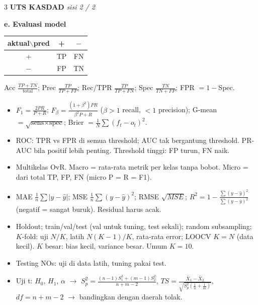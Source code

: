 \documentclass[8pt]{extarticle}
\newcommand{\sect}[1]{\par\vspace{1.5pt}\colorbox{black!12}{\parbox{\dimexpr\columnwidth-2\fboxsep}{\textbf{#1}}}\par\vspace{0.8pt}}
\begin{document}
\begin{multicols*}{3}
\textbf{UTS KASDAD} \hfill \textit{sisi 2 / 2}\par
\sect{e. Evaluasi model}
\begin{tabular}{@{}c|cc@{}}
aktual$\backslash$pred & + & $-$\\\hline
+ & TP & FN\\
$-$ & FP & TN
\end{tabular}\quad
\par Acc $\frac{TP+TN}{\text{total}}$; Prec $\frac{TP}{TP+FP}$; Rec/TPR $\frac{TP}{TP+FN}$; Spec $\frac{TN}{TN+FP}$; FPR $=1-$Spec.\par
\begin{itemize}
\item $F_1=\frac{2PR}{P+R}$; $F_\beta=\frac{(1+\beta^2)PR}{\beta^2P+R}$ ($\beta>1$ recall, $<1$ precision); G-mean $=\sqrt{\text{sens}\times\text{spec}}$; Brier $=\frac1N\sum(f_t-o_t)^2$.
\item ROC: TPR vs FPR di semua threshold; AUC tak bergantung threshold. PR-AUC bila positif lebih penting. Threshold tinggi: FP turun, FN naik.
\item Multikelas OvR. Macro = rata-rata metrik per kelas tanpa bobot. Micro = dari total TP, FP, FN (micro P = R = F1).
\item MAE $\frac1n\sum|y-\hat y|$; MSE $\frac1n\sum(y-\hat y)^2$; RMSE $\sqrt{MSE}$; $R^2=1-\frac{\sum(y-\hat y)^2}{\sum(y-\bar y)^2}$ (negatif = sangat buruk). Residual harus acak.
\item Holdout; train/val/test (val untuk tuning, test sekali); random subsampling; $K$-fold: uji $N/K$, latih $N(K-1)/K$, rata-rata error; LOOCV $K=N$ (data kecil). $K$ besar: bias kecil, variance besar. Umum $K=10$.
\item Testing NOs: uji di data latih, tuning pakai test.
\item Uji t: $H_0$, $H_1$, $\alpha$ $\to$ $S_p^2=\frac{(n-1)S_1^2+(m-1)S_2^2}{n+m-2}$, $TS=\frac{\bar X_1-\bar X_2}{\sqrt{S_p^2(\frac1n+\frac1m)}}$, $df=n+m-2$ $\to$ bandingkan dengan daerah tolak.
\end{itemize}


\end{multicols*}
\end{document}
